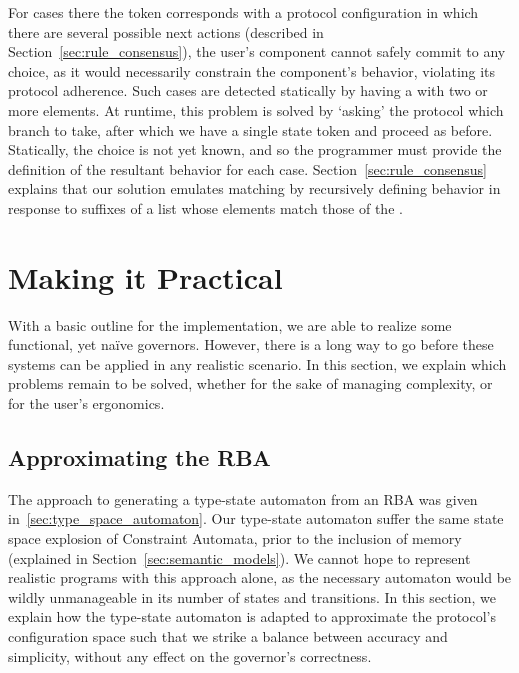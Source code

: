 For cases there the token corresponds with a protocol configuration in which there are several possible next actions (described in Section~\ref{sec:rule_consensus}), the user's component cannot safely commit to any choice, as it would necessarily constrain the component's behavior, violating its protocol adherence. Such cases are detected statically by having a  with two or more elements. At runtime, this problem is solved by `asking' the protocol which branch to take, after which we have a single state token and proceed as before. Statically, the choice is not yet known, and so the programmer must provide the definition of the resultant behavior for each case. Section~\ref{sec:rule_consensus} explains that our solution emulates matching by recursively defining behavior in response to suffixes of a list whose elements match those of the .

\section{Making it Practical}
\label{sec:making_it_practical}
With a basic outline for the implementation, we are able to realize some functional, yet na\"ive governors. However, there is a long way to go before these systems can be applied in any realistic scenario. In this section, we explain which problems remain to be solved, whether for the sake of managing complexity, or for the user's ergonomics.

\subsection{Approximating the RBA}
The approach to generating a type-state automaton from an RBA was given in~\ref{sec:type_space_automaton}. Our type-state automaton suffer the same state space explosion of Constraint Automata, prior to the inclusion of memory (explained in Section~\ref{sec:semantic_models}). We cannot hope to represent realistic programs with this approach alone, as the necessary automaton would be wildly unmanageable in its number of states and transitions. In this section, we explain how the type-state automaton is adapted to approximate the protocol's configuration space such that we strike a balance between accuracy and simplicity, without any effect on the governor's correctness.

